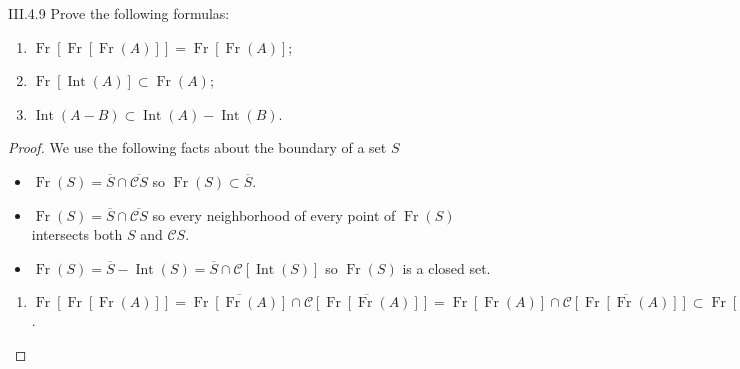 \begin{problem}{III.4.9}
Prove the following formulas:
\begin{enumerate}[label={(\alph*)},itemsep=0pt]
    \item \( \operatorname{Fr}\left[ \operatorname{Fr}\left[ \operatorname{Fr}(A) \right] \right] = \operatorname{Fr}\left[ \operatorname{Fr}(A) \right] \);
    \item \( \operatorname{Fr}\left[ \operatorname{Int}(A) \right] \subset \operatorname{Fr}(A) \);
    \item \( \operatorname{Int}(A - B) \subset \operatorname{Int}(A) - \operatorname{Int}(B) \).
\end{enumerate}
\end{problem}

\begin{proof}
    We use the following facts about the boundary of a set \(S\)
    \begin{itemize}[leftmargin=*]
        \item \( \operatorname{Fr}(S) = \overline{S} \cap \overline{\mathscr{C}S} \) so \( \operatorname{Fr}(S) \subset \overline{S} \).
        \item \( \operatorname{Fr}(S) = \overline{S} \cap \overline{\mathscr{C}S} \) so every neighborhood of every point of \( \operatorname{Fr}(S) \) intersects both \( S \) and \( \mathscr{C}S \).
        \item \( \operatorname{Fr}(S) = \overline{S} - \operatorname{Int}(S) = \overline{S} \cap \mathscr{C}\left[ \operatorname{Int}(S) \right] \) so \( \operatorname{Fr}(S) \) is a closed set.
    \end{itemize}
    \begin{enumerate}[label={(\alph*)},itemsep=0pt,leftmargin=*]
        \item \( \operatorname{Fr}\left[\operatorname{Fr}\left[\operatorname{Fr}(A)\right]\right] = \overline{\operatorname{Fr}\left[\operatorname{Fr}(A)\right]} \cap \overline{\mathscr{C}\left[\operatorname{Fr}\left[\operatorname{Fr}(A)\right]\right]} = \operatorname{Fr}\left[\operatorname{Fr}(A)\right] \cap \overline{\mathscr{C}\left[\operatorname{Fr}\left[\operatorname{Fr}(A)\right]\right]} \subset \operatorname{Fr}\left[\operatorname{Fr}(A)\right] \).


\end{enumerate}
\end{proof}
